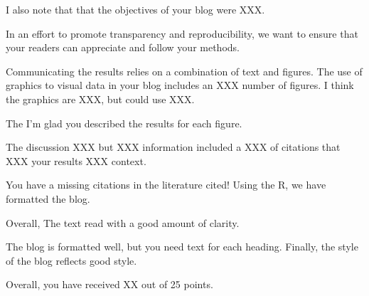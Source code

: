 \documentclass{article}\usepackage[]{graphicx}\usepackage[]{color}
\begin{document}
I also note that that the objectives of your blog were XXX.

In an effort to promote transparency and reproducibility, we want to ensure that your readers can appreciate and follow your methods. 


Communicating the results relies on a combination of text and figures. The use of graphics to visual data in your blog includes an XXX number of figures. I think the graphics are XXX, but could use XXX. 

The I'm glad you described the results for each figure. 


The discussion XXX but XXX information included a XXX of citations that XXX your results XXX context. 

You have a missing citations in the literature cited!  Using the R, we have formatted the blog.

Overall, The text read with a good amount of clarity. 

The blog is formatted well, but you need text for each heading. Finally, the style of the blog reflects good style.

Overall, you have received XX out of 25 points.
\end{document}
